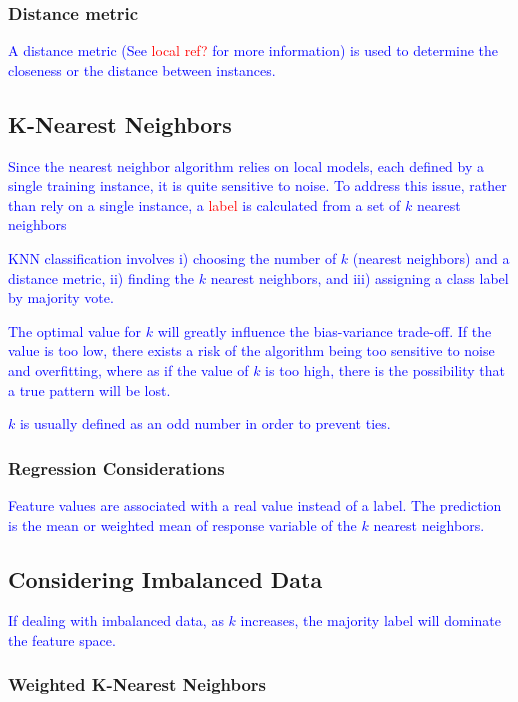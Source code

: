 \subsubsection{Distance metric}

\textcolor{blue}{A distance metric (See \textcolor{red}{local ref?} for more information) is used to determine the closeness or the distance between instances.}

\subsection{K-Nearest Neighbors}

\textcolor{blue}{Since the nearest neighbor algorithm relies on local models, each defined by a single training instance, it is quite sensitive to noise. To address this issue, rather than rely on a single instance, a \textcolor{red}{label} is calculated from a set of $k$ nearest neighbors}

\textcolor{blue}{KNN classification involves i) choosing the number of $k$ (nearest neighbors) and a distance metric, ii) finding the $k$ nearest neighbors, and iii) assigning a class label by majority vote.}

\textcolor{blue}{The optimal value for $k$ will greatly influence the bias-variance trade-off. If the value is too low, there exists a risk of the algorithm being too sensitive to noise and overfitting, where as if the value of $k$ is too high, there is the possibility that a true pattern will be lost.}

\textcolor{blue}{$k$ is usually defined as an odd number in order to prevent ties.}

\subsubsection{Regression Considerations}

\textcolor{blue}{Feature values are associated with a real value instead of a label. The prediction is the mean or weighted mean of response variable of the $k$ nearest neighbors.}

\subsection{Considering Imbalanced Data}

\textcolor{blue}{If dealing with imbalanced data, as $k$ increases, the majority label will dominate the feature space.}

\subsubsection{Weighted K-Nearest Neighbors}


